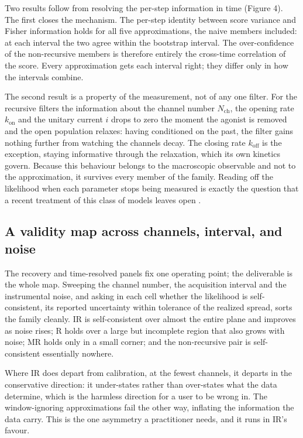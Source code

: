Two results follow from resolving the per-step information in time (Figure 4). The first closes the mechanism. The per-step identity between score variance and Fisher information holds for all five approximations, the naive members included: at each interval the two agree within the bootstrap interval. %
The over-confidence of the non-recursive members is therefore entirely the cross-time correlation of the score. Every approximation gets each interval right; they differ only in how the intervals combine.

The second result is a property of the measurement, not of any one filter. For the recursive filters the information about the channel number $N_{\mathrm{ch}}$, the opening rate $k_{\mathrm{on}}$ and the unitary current $i$ drops to zero the moment the agonist is removed and the open population relaxes: having conditioned on the past, the filter gains nothing further from watching the channels decay. %
The closing rate $k_{\mathrm{off}}$ is the exception, staying informative through the relaxation, which its own kinetics govern. Because this behaviour belongs to the macroscopic observable and not to the approximation, it survives every member of the family. Reading off the likelihood when each parameter stops being measured is exactly the question that a recent treatment of this class of models leaves open \cite{delcore2025parameter}.

\subsection*{A validity map across channels, interval, and noise}

The recovery and time-resolved panels fix one operating point; the deliverable is the whole map. Sweeping the channel number, the acquisition interval and the instrumental noise, and asking in each cell whether the likelihood is self-consistent, its reported uncertainty within tolerance of the realized spread, sorts the family cleanly. IR is self-consistent over almost the entire plane and improves as noise rises; R holds over a large but incomplete region that also grows with noise; MR holds only in a small corner; and the non-recursive pair is self-consistent essentially nowhere. 

Where IR does depart from calibration, at the fewest channels, it departs in the conservative direction: it under-states rather than over-states what the data determine, which is the harmless direction for a user to be wrong in. %
The window-ignoring approximations fail the other way, inflating the information the data carry. This is the one asymmetry a practitioner needs, and it runs in IR's favour.

